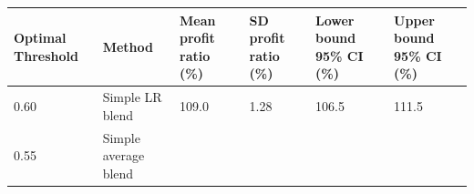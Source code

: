 \documentclass[]{elsarticle} %
\begin{document}
\begin{longtable}[]{@{}llllll@{}}
\toprule
\begin{minipage}[b]{0.08\columnwidth}\raggedright\strut
Optimal Threshold\strut
\end{minipage} & \begin{minipage}[b]{0.14\columnwidth}\raggedright\strut
Method\strut
\end{minipage} & \begin{minipage}[b]{0.16\columnwidth}\raggedright\strut
Mean profit ratio (\%)\strut
\end{minipage} & \begin{minipage}[b]{0.14\columnwidth}\raggedright\strut
SD profit ratio (\%)\strut
\end{minipage} & \begin{minipage}[b]{0.16\columnwidth}\raggedright\strut
Lower bound 95\% CI (\%)\strut
\end{minipage} & \begin{minipage}[b]{0.16\columnwidth}\raggedright\strut
Upper bound 95\% CI (\%)\strut
\end{minipage}\tabularnewline
\midrule
\endhead
\begin{minipage}[t]{0.08\columnwidth}\raggedright\strut
0.60\strut
\end{minipage} & \begin{minipage}[t]{0.14\columnwidth}\raggedright\strut
Simple LR blend\strut
\end{minipage} & \begin{minipage}[t]{0.16\columnwidth}\raggedright\strut
109.0\strut
\end{minipage} & \begin{minipage}[t]{0.14\columnwidth}\raggedright\strut
1.28\strut
\end{minipage} & \begin{minipage}[t]{0.16\columnwidth}\raggedright\strut
106.5\strut
\end{minipage} & \begin{minipage}[t]{0.16\columnwidth}\raggedright\strut
111.5\strut
\end{minipage}\tabularnewline
\begin{minipage}[t]{0.08\columnwidth}\raggedright\strut
0.55\strut
\end{minipage} & \begin{minipage}[t]{0.14\columnwidth}\raggedright\strut
Simple average blend\strut
\end{minipage} & \begin{minipage}[t]{0.16\columnwidth}\raggedright\strut

\end{minipage}
\end{longtable}
\end{document}
